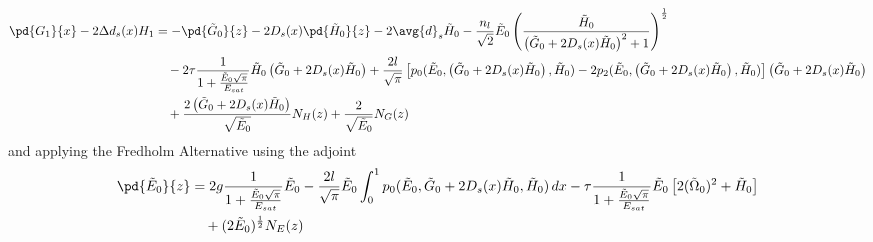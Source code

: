 \begin{equation}
\begin{split}
\pd{G_1}{x}- 2\Delta d_s(x) H_1 &= -\pd{\tilde{G}_0}{z} - 2 D_s(x) \pd{\tilde{H}_0}{z} - 2 \avg{d}_s \tilde{H}_0 - \frac{n_{l}}{\sqrt{2}}\tilde{E}_0 \left(\frac{\tilde{H}_0}{\left(\tilde{G}_0+ 2 D_s(x) \tilde{H}_0\right)^2+1}\right)^{\frac{1}{2}} \\
&\quad- 2\tau\frac{1}{1+\frac{\tilde{E}_0 \sqrt{\pi}}{E_{sat}}}\tilde{H}_0 \left(\tilde{G}_0+ 2 D_s(x) \tilde{H}_0\right) + \frac{2l}{\sqrt{\pi}}\left[p_0(\tilde{E}_0,\left(\tilde{G}_0+ 2 D_s(x) \tilde{H}_0\right),\tilde{H}_0) - 2p_2(\tilde{E}_0,\left(\tilde{G}_0+ 2 D_s(x) \tilde{H}_0\right),\tilde{H}_0)\right]\left(\tilde{G}_0+ 2 D_s(x) \tilde{H}_0\right) \\
&\quad+ \frac{2\left(\tilde{G}_0+ 2 D_s(x) \tilde{H}_0\right)}{\sqrt{\tilde{E}_0}} N_H(z) + \frac{2}{\sqrt{\tilde{E}_0}} N_G(z) \\
\end{split}
\end{equation}
and applying the Fredholm Alternative using the adjoint
\begin{equation}
\begin{split}
\pd{\tilde{E}_0}{z} &= 2g \frac{1}{1+\frac{\tilde{E}_0\sqrt{\pi}}{E_{sat}}} \tilde{E}_0 - \frac{2l}{\sqrt{\pi}}\tilde{E}_0  \int_{0}^{1} p_0(\tilde{E}_0,\tilde{G}_0 + 2 D_s(x) \tilde{H}_0,\tilde{H}_0) \,dx - \tau \frac{1}{1+\frac{\tilde{E}_0\sqrt{\pi}}{E_{sat}}} \tilde{E}_0 \left[2 (\tilde{\Omega}_0)^2 + \tilde{H}_0\right] \\
&\quad+ (2\tilde{E}_0)^{\frac{1}{2}}N_E(z) \\
\end{split}
\end{equation}
